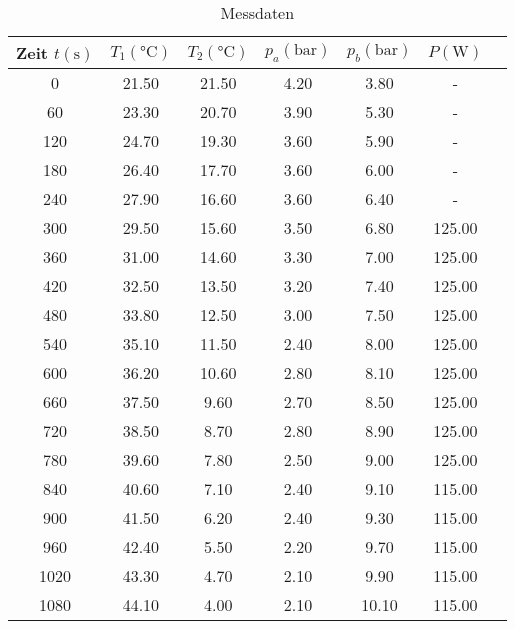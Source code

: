 \begin{table}
  \centering
  \caption{Messdaten}
  \label{tab:Messdaten}
  \begin{tabular}{c c c c c c c}  %
    \toprule
    {Zeit $t (\unit{\second})$} &
    {$T_{1} (\unit{\celsius})$}&
    {$T_{2} (\unit{\celsius})$}&
    {$p_{a} (\unit{\bar})$}&
    {$p_{b} (\unit{\bar})$}&
    {$P (\unit{\watt})$} \\
    \midrule
       0 &    21.50 &     21.50 &       4.20 &       3.80 &      - \\
      60 &    23.30 &     20.70 &       3.90 &       5.30 &      - \\
     120 &    24.70 &     19.30 &       3.60 &       5.90 &      - \\
     180 &    26.40 &     17.70 &       3.60 &       6.00 &      - \\
     240 &    27.90 &     16.60 &       3.60 &       6.40 &      - \\
     300 &    29.50 &     15.60 &       3.50 &       6.80 & 125.00 \\
     360 &    31.00 &     14.60 &       3.30 &       7.00 & 125.00 \\
     420 &    32.50 &     13.50 &       3.20 &       7.40 & 125.00 \\
     480 &    33.80 &     12.50 &       3.00 &       7.50 & 125.00 \\
     540 &    35.10 &     11.50 &       2.40 &       8.00 & 125.00 \\
     600 &    36.20 &     10.60 &       2.80 &       8.10 & 125.00 \\
     660 &    37.50 &      9.60 &       2.70 &       8.50 & 125.00 \\
     720 &    38.50 &      8.70 &       2.80 &       8.90 & 125.00 \\
     780 &    39.60 &      7.80 &       2.50 &       9.00 & 125.00 \\
     840 &    40.60 &      7.10 &       2.40 &       9.10 & 115.00 \\
     900 &    41.50 &      6.20 &       2.40 &       9.30 & 115.00 \\
     960 &    42.40 &      5.50 &       2.20 &       9.70 & 115.00 \\
    1020 &    43.30 &      4.70 &       2.10 &       9.90 & 115.00 \\
    1080 &    44.10 &      4.00 &       2.10 &      10.10 & 115.00 \\

\end{tabular}
\end{table}
